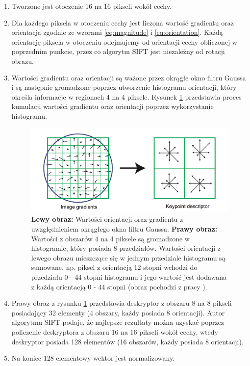 \begin{enumerate}
\item Tworzone jest otoczenie 16 na 16 pikseli wokół cechy.
\item Dla każdego piksela w otoczeniu cechy jest liczona wartość gradientu oraz orientacja zgodnie ze wzorami \ref{eq:magnitude} i \ref{eq:orientation}. Każdą orientację piksela w otoczeniu odejmujemy od orientacji cechy obliczonej w poprzednim punkcie, przez co algorytm SIFT jest niezależny od rotacji obrazu.
\item Wartości gradientu oraz orientacji są ważone przez okrągłe okno filtru Gaussa i są następnie gromadzone poprzez utworzenie histogramu orientacji, który określa informacje w regionach 4 na 4 piksele. Rysunek \ref{fig:proponowane_algorytmy:descriptor} przedstawia proces kumulacji wartości gradientu oraz orientacji poprzez wykorzystanie histogramu.

\begin{figure}[H]
  \centering
  \includegraphics[width=\textwidth]{gfx/descriptor}
  \caption{\textbf{Lewy obraz:} Wartości orientacji oraz gradientu z uwzględnieniem okrągłego okna filtru Gaussa. \textbf{Prawy obraz:} Wartości z obszarów 4 na 4 piksele są gromadzone w histogramie, który posiada 8 przedziałów. Wartości orientacji z lewego obrazu mieszczące się w jednym przedziale histogramu są sumowane, np. piksel z orientacją 12 stopni wchodzi do przedziału 0 - 44 stopni histogramu i jego wartość jest dodawana z każdą orientacją 0 - 44 stopni (obraz pochodzi z pracy \cite{Lowe:2004:DIF:993451.996342}).}
  \label{fig:proponowane_algorytmy:descriptor}
\end{figure}

\item Prawy obraz z rysunku \ref{fig:proponowane_algorytmy:descriptor} przedstawia deskryptor z obszaru 8 na 8 pikseli posiadający 32 elementy (4 obszary, każdy posiada 8 orientacji). Autor algorytmu SIFT podaje, że najlepsze rezultaty można uzyskać poprzez policzenie deskryptora z obszaru 16 na 16 pikseli wokół cechy, wtedy deskryptor posiada 128 elementów (16 obszarów, każdy posiada 8 orientacji).
\item Na koniec 128 elementowy wektor jest normalizowany.
\end{enumerate}

